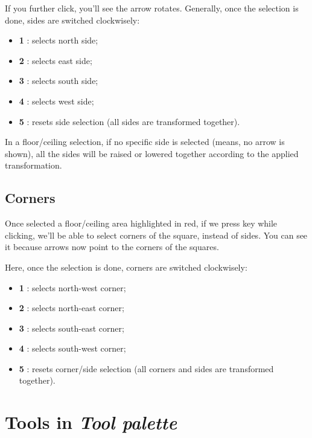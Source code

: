 \par If you further click, you'll see the arrow rotates. Generally, once the selection is done, sides are switched clockwisely:
\begin{itemize}
    \item \textbf{1 }: selects north side;
    \item \textbf{2 }: selects east side;
    \item \textbf{3 }: selects south side;
    \item \textbf{4 }: selects west side;
    \item \textbf{5 }: resets side selection (all sides are transformed together).
\end{itemize}

\begin{remark}
    In a floor/ceiling selection, if no specific side is selected (means, no arrow is shown), all the sides will be raised or lowered together according to the applied transformation.
\end{remark}

\section{Corners}

Once selected a floor/ceiling area highlighted in red, if we press  key while clicking, we'll be able to select corners of the square, instead of sides. You can see it because arrows now point to the corners of the squares.
\par Here, once the selection is done, corners are switched clockwisely:
\begin{itemize}
    \item \textbf{1 }: selects north-west corner;
    \item \textbf{2 }: selects north-east corner;
    \item \textbf{3 }: selects south-east corner;
    \item \textbf{4 }: selects south-west corner;
    \item \textbf{5 }: resets corner/side selection (all corners and sides are transformed together).
\end{itemize}

\chapter{Tools in \emph{Tool palette}}

